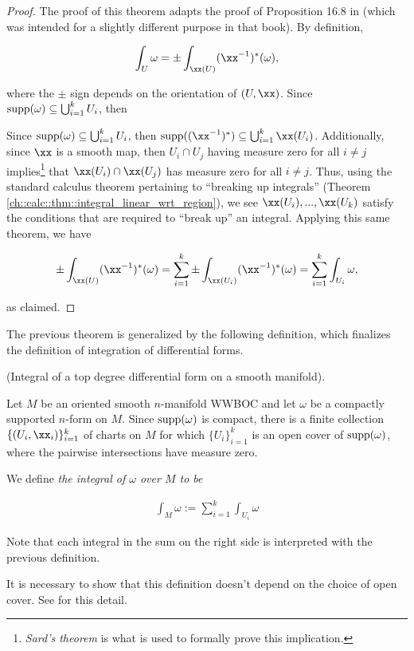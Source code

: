 \begin{proof}
    The proof of this theorem adapts the proof of Proposition 16.8 in \cite{book::SM} (which was intended for a slightly different purpose in that book). By definition,
    
    \begin{align*}
        \int_U \omega = \pm \int_{\xx(U)} (\xx^{-1})^*(\omega),
    \end{align*}
    
    where the $\pm$ sign depends on the orientation of $(U, \xx)$. Since $\text{supp}(\omega) \subseteq \bigcup_{i = 1}^k U_i$, then
    
    Since $\text{supp}(\omega) \subseteq \bigcup_{i = 1}^k U_i$, then $\supp((\xx^{-1})^*) \subseteq \bigcup_{i = 1}^k \xx(U_i)$. Additionally, since $\xx$ is a smooth map, then $U_i \cap U_j$ having measure zero for all $i \neq j$ implies\footnote{\textit{Sard's theorem} is what is used to formally prove this implication.} that $\xx(U_i) \cap \xx(U_j)$ has measure zero for all $i \neq j$. Thus, using the standard calculus theorem pertaining to ``breaking up integrals'' (Theorem \ref{ch::calc::thm::integral_linear_wrt_region}), we see $\xx(U_i), ..., \xx(U_k)$ satisfy the conditions that are required to ``break up'' an integral. Applying this same theorem, we have
    
    \begin{align*}
        \pm \int_{\xx(U)} (\xx^{-1})^*(\omega) 
        = \sum_{i = 1}^k \pm \int_{\xx(U_i)} (\xx^{-1})^*(\omega)
        = \sum_{i = 1}^k \int_{U_i} \omega,
    \end{align*}
    
    as claimed.
\end{proof}

The previous theorem is generalized by the following definition, which finalizes the definition of integration of differential forms.

\begin{defn}
\label{ch::diff_forms::defn::integral_over_manifold}
     (Integral of a top degree differential form on a smooth manifold).
    
    Let $M$ be an oriented smooth $n$-manifold WWBOC and let $\omega$ be a compactly supported $n$-form on $M$. Since $\text{supp}(\omega)$ is compact, there is a finite collection $\{(U_i, \xx_i)\}_{i = 1}^k$ of charts on $M$ for which $\{U_i\}_{i = 1}^k$ is an open cover of $\text{supp}(\omega)$, where the pairwise intersections have measure zero.
    
    We define \textit{the integral of $\omega$ over $M$ to be}
    
    \begin{align*}
        \boxed
        {
            \int_M \omega := \sum_{i = 1}^k \int_{U_i} \omega
        }
    \end{align*}
    
    Note that each integral in the sum on the right side is interpreted with the previous definition.
    
    It is necessary to show that this definition doesn't depend on the choice of open cover. See \cite{Lee} for this detail.
\end{defn}

